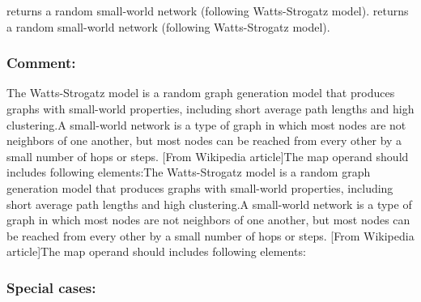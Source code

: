 \documentclass[]{book}
\theoremstyle{definition}
\theoremstyle{definition}
\theoremstyle{definition}
\theoremstyle{remark}
\begin{document}
returns a random small-world network (following Watts-Strogatz model).
returns a random small-world network (following Watts-Strogatz model).

\subsubsection{Comment:}\label{comment-42}

The Watts-Strogatz model is a random graph generation model that
produces graphs with small-world properties, including short average
path lengths and high clustering.A small-world network is a type of
graph in which most nodes are not neighbors of one another, but most
nodes can be reached from every other by a small number of hops or
steps. {[}From Wikipedia article{]}The map operand should includes
following elements:The Watts-Strogatz model is a random graph generation
model that produces graphs with small-world properties, including short
average path lengths and high clustering.A small-world network is a type
of graph in which most nodes are not neighbors of one another, but most
nodes can be reached from every other by a small number of hops or
steps. {[}From Wikipedia article{]}The map operand should includes
following elements:

\subsubsection{Special cases:}\label{special-cases-69}
\end{document}
